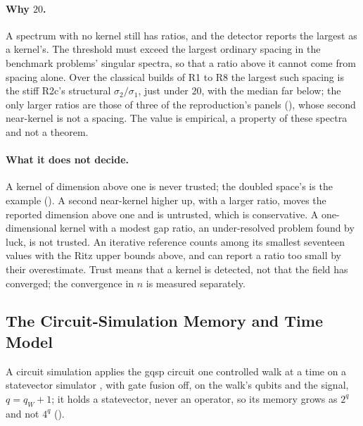 \paragraph{Why $20$.} A spectrum with no kernel still has ratios, and the detector reports the largest as a kernel's. The threshold must exceed the largest ordinary spacing in the benchmark problems' singular spectra, so that a ratio above it cannot come from spacing alone. Over the classical builds of R1 to R8 the largest such spacing is the stiff R2c's structural $\sigma_2/\sigma_1$, just under $20$, with the median far below; the only larger ratios are those of three of the reproduction's panels (), whose second near-kernel is not a spacing. The value is empirical, a property of these spectra and not a theorem.

\paragraph{What it does not decide.} A kernel of dimension above one is never trusted; the doubled space's is the example (). A second near-kernel higher up, with a larger ratio, moves the reported dimension above one and is untrusted, which is conservative. A one-dimensional kernel with a modest gap ratio, an under-resolved problem found by luck, is not trusted. An iterative reference counts among its smallest seventeen values with the Ritz upper bounds above, and can report a ratio too small by their overestimate. Trust means that a kernel is detected, not that the field has converged; the convergence in $n$ is measured separately.

\subsection{The Circuit-Simulation Memory and Time Model}
\label{app:t1-model}

A circuit simulation applies the \gls{gqsp} circuit one controlled walk at a time on a statevector simulator \cite{qiskit2024}, with gate fusion off, on the walk's qubits and the signal, $q=q_W+1$; it holds a statevector, never an operator, so its memory grows as $2^q$ and not $4^q$ ().

